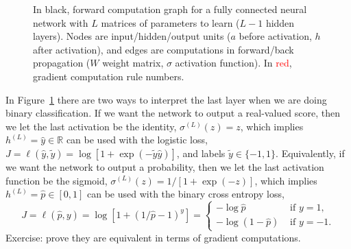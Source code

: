 \documentclass{article}
\begin{document}
\begin{figure}
  \caption{In black, forward computation graph for a fully connected
    neural network with $L$ matrices of parameters to learn ($L-1$
    hidden layers). Nodes are input/hidden/output units ($a$ before
    activation, $h$ after activation), and edges are computations in
    forward/back propagation ($W$ weight matrix, $\sigma$ activation
    function). In \textcolor{red}{red}, gradient computation rule numbers.}
  \label{fig:forward-back-propagation}
\end{figure}

In Figure~\ref{fig:forward-back-propagation} there are two ways to
interpret the last layer when we are doing binary
classification. If we want the network to output a real-valued
score, then we let the last activation be the identity,
$\sigma^{(L)}(z)=z$, which implies $h^{(L)}=\hat y\in\mathbb R$ can be
used with the logistic loss,
$J =\ell(\hat y, \tilde y) = \log[1+\exp(-\tilde y \hat y)]$, and
labels $\tilde y\in\{-1,1\}$. Equivalently, if we want the network to
output a probability, then we let the last activation function be the
sigmoid, $\sigma^{(L)}(z) = 1/[1+\exp(-z)]$, which implies
$h^{(L)}=\hat p\in[0,1]$ can be used with the binary cross entropy
loss,
\begin{equation}
  \label{eq:binary_cross_entropy_loss}
  J=\ell(\hat p, y) = \log[ 1+ (1/\hat p - 1)^y ] = \begin{cases}
    -\log \hat p & \text{ if } y=1, \\
    -\log (1-\hat p) & \text{ if } y=-1.
  \end{cases}
\end{equation}
Exercise: prove they are equivalent in terms of
gradient computations.
\end{document}
